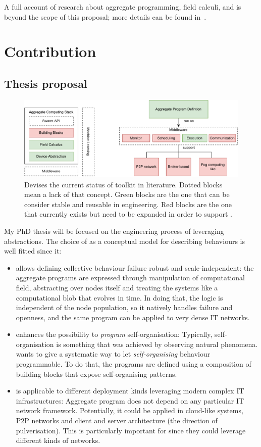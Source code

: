\documentclass[11pt]{article}
\begin{document}
A full account of research about aggregate programming, field calculi, and \scafi{} is beyond the scope of this proposal; more details can be found in~\cite{viroli2019jlamp-si-coord,DBLP:journals/eaai/CasadeiVAPD21}.

\section{Contribution} \label{contribution}
\subsection{Thesis proposal}
\begin{figure}
	\centering
	\includegraphics[width=\textwidth]{img/to-do-for-thesis.pdf}
	\caption{Devises the current status of \ac{} toolkit in literature. Dotted blocks mean a lack of that concept. Green blocks are the one that can be consider stable and reusable in \cpsw{} engineering. Red blocks are the one that currently exists but need to be expanded in order to support \cpsw{}.}
	\label{fig:current-state}
\end{figure}
My PhD thesis will be focused on the engineering process of \cpsw{} leveraging \ac{} abstractions. The choice of \ac{} as a conceptual model for describing \cpsw{} behaviours is well fitted since it:
\begin{itemize}
	\item allows defining collective behaviour failure robust and scale-independent: the aggregate programs are expressed through manipulation of computational field, abstracting over nodes itself and treating the systems like a computational blob that evolves in time. In doing that, the logic is independent of the node population, so it natively handles failure and openness, and the same program can be applied to very dense IT networks.
	\item enhances the possibility to \textit{program} self-organisation: Typically, self-organisation is something that was achieved by observing natural phenomena. \ac{} wants to give a systematic way to let \textit{self-organising} behaviour programmable. To do that, the programs are defined using a composition of building blocks that expose self-organising patterns.
	\item is applicable to different deployment kinds leveraging modern complex IT infrastructures: Aggregate program does not depend on any particular IT network framework. Potentially, it could be applied in cloud-like systems, P2P networks and client and server architecture (the direction of pulverisation). This is particularly important for \cpsw{} since they could leverage different kinds of networks.
\end{itemize}
\end{document}
